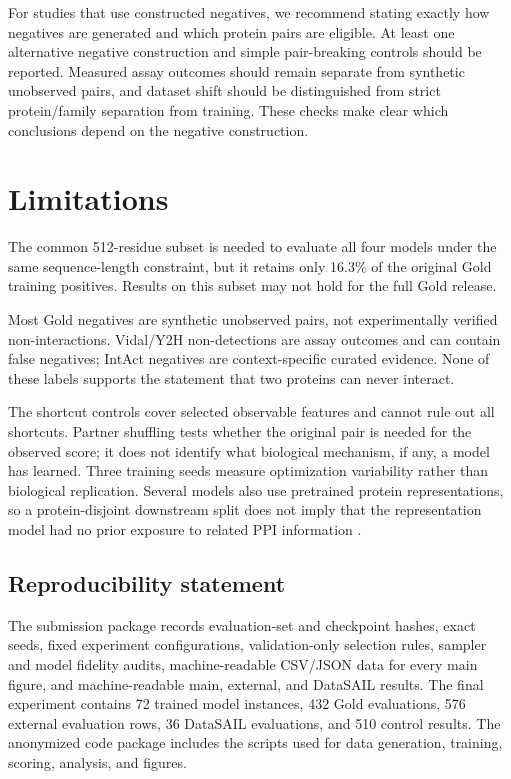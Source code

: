 \documentclass{article}
\begin{document}
For studies that use constructed negatives, we recommend stating exactly how
negatives are generated and which protein pairs are eligible. At least one
alternative negative construction and simple pair-breaking controls should be
reported. Measured assay outcomes should remain separate from synthetic
unobserved pairs, and dataset shift should be distinguished from strict
protein/family separation from training. These checks make clear which
conclusions depend on the negative construction.

\section{Limitations}

The common 512-residue subset is needed to evaluate all four models under the
same sequence-length constraint, but it retains only 16.3\% of the original
Gold training positives. Results on this subset may not hold for the full Gold
release.

Most Gold negatives are synthetic unobserved pairs, not experimentally verified
non-interactions. Vidal/Y2H non-detections are assay outcomes and can contain
false negatives; IntAct negatives are context-specific curated evidence. None
of these labels supports the statement that two proteins can never interact.

The shortcut controls cover selected observable features and cannot rule out
all shortcuts. Partner shuffling tests whether the original pair is needed for
the observed score; it does not identify what biological mechanism, if any, a
model has learned. Three training seeds measure optimization variability rather
than biological replication. Several models also use pretrained protein
representations, so a protein-disjoint downstream split does not imply that the
representation model had no prior exposure to related PPI information
\citep{szymborski2026}.

\subsection*{Reproducibility statement}

The submission package records evaluation-set and checkpoint hashes, exact
seeds, fixed experiment configurations, validation-only selection rules,
sampler and model fidelity audits, machine-readable CSV/JSON data for every
main figure, and machine-readable main, external, and DataSAIL results. The
final experiment contains 72 trained model instances, 432 Gold evaluations,
576 external evaluation rows, 36 DataSAIL evaluations, and 510 control
results. The anonymized code package includes
the scripts used for data generation, training, scoring, analysis, and figures.
\end{document}
